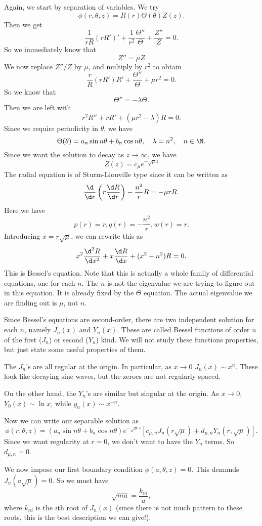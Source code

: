 \documentclass[a4paper]{article}
\begin{document}
Again, we start by separation of variables. We try
\[
  \phi(r, \theta, z) = R(r) \Theta(\theta)Z(z).
\]
Then we get
\[
  \frac{1}{rR} (rR')' + \frac{1}{r^2}\frac{\Theta''}{\Theta} + \frac{Z''}{Z} = 0.
\]
So we immediately know that
\[
  Z'' = \mu Z
\]
We now replace $Z''/Z$ by $\mu$, and multiply by $r^2$ to obtain
\[
  \frac{r}{R}(rR')R' + \frac{\Theta''}{\Theta} + \mu r^2 = 0.
\]
So we know that
\[
  \Theta'' = -\lambda \Theta.
\]
Then we are left with
\[
  r^2 R'' + rR' + (\mu r^2 - \lambda)R = 0.
\]
Since we require periodicity in $\theta$, we have
\[
  \Theta(\theta) = a_n \sin n\theta + b_n \cos n\theta, \quad \lambda = n^2,\quad n \in \N.
\]
Since we want the solution to decay as $z \to \infty$, we have
\[
  Z(z) = c_\mu e^{-\sqrt{\mu}z}
\]
The radial equation is of Sturm-Liouville type since it can be written as
\[
  \frac{\d}{\d r}\left(r \frac{\d R}{\d r}\right) - \frac{n^2}{r}R = -\mu rR.
\]
Here we have
\[
  p(r) = r, q(r) = -\frac{n^2}{r}, w(r) = r.
\]
Introducing $x = r\sqrt{\mu}$, we can rewrite this as
\[
  x^2 \frac{\d^2 R}{\d x^2} + x\frac{\d R}{\d x} + (x^2 - n^2)R = 0.
\]
This is Bessel's equation. Note that this is actually a whole family of differential equations, one for each $n$. The $n$ is not the eigenvalue we are trying to figure out in this equation. It is already fixed by the $\Theta$ equation.  The actual eigenvalue we are finding out is $\mu$, not $n$.

Since Bessel's equations are second-order, there are two independent solution for each $n$, namely $J_n(x)$ and $Y_n(x)$. These are called Bessel functions of order $n$ of the first ($J_n$) or second ($Y_n$) kind. We will not study these functions properties, but just state some useful properties of them.

The $J_n$'s are all regular at the origin. In particular, as $x \to 0$ $J_n (x) \sim x^n$. These look like decaying sine waves, but the zeroes are not regularly spaced.

On the other hand, the $Y_n$'s are similar but singular at the origin. As $x \to 0$, $Y_0(x) \sim \ln x$, while $y_n(x) \sim x^{-n}$.

Now we can write our separable solution as
\[
  \phi(r, \theta, z) = (a_n \sin n \theta + b_n \cos n\theta) e^{-\sqrt{\mu}z} [c_{\mu, n}J_n (r\sqrt{\mu}) + d_{\mu, n}Y_n (r, \sqrt{\mu})].
\]
Since we want regularity at $r = 0$, we don't want to have the $Y_n$ terms. So $d_{\mu, n} = 0$.

We now impose our first boundary condition $\phi(a, \theta, z) = 0$. This demands $J_n(a \sqrt{\mu}) = 0$. So we must have
\[
  \sqrt{mu} = \frac{k_{ni}}{a},
\]
where $k_{ni}$ is the $i$th root of $J_n(x)$ (since there is not much pattern to these roots, this is the best description we can give!).
\end{document}
